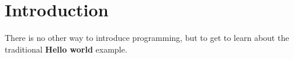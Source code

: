 
\chapter{Introduction}



There is no other way to introduce programming, but to get to learn about the traditional \textbf{Hello world} example.
